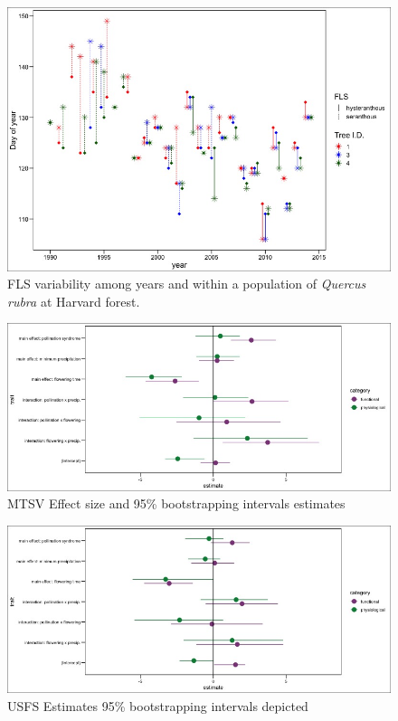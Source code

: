 \documentclass[12pt]{article}\usepackage[]{graphicx}\usepackage[]{color}
\begin{document}
 \begin{figure}
        \centering
          \includegraphics[width=\textwidth]{..//figure/HF_Q_ru_interannual.jpeg}
        \caption{FLS variability among years and within a population of \textit{Quercus rubra} at Harvard forest.}
        \label{fig: Figure 3}
    \end{figure}
  
    \begin{figure}
    \centering
    \includegraphics[width=\textwidth]{..//figure/MTSV_effectsize.jpeg}
    \caption{MTSV Effect size and 95\% bootstrapping intervals estimates}
    \label{fig:Figure 4}
    \end{figure}
    
        \begin{figure}
    \centering
    \includegraphics[width=\textwidth]{..//figure/USFS_effectsize.jpeg}
    \caption{USFS Estimates 95\% bootstrapping intervals depicted}
    \label{fig:Figure 5}
    \end{figure}
\end{document}
